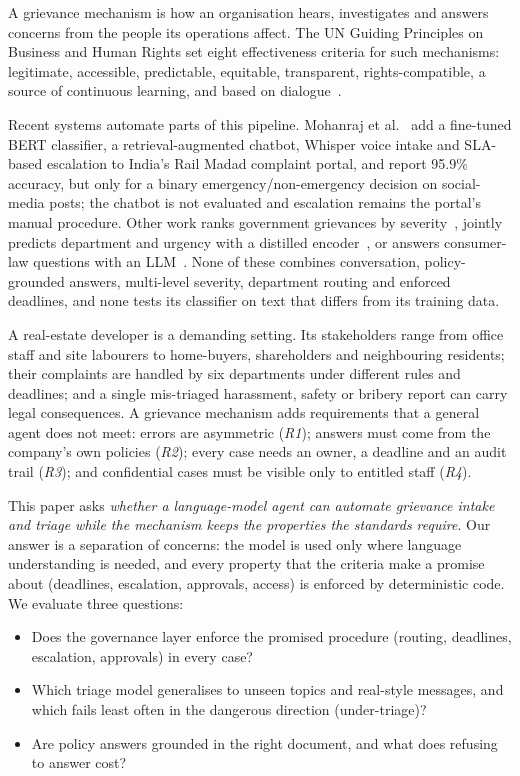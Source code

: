 \documentclass[conference]{IEEEtran}
\begin{document}
A grievance mechanism is how an organisation hears, investigates and answers concerns from the people its
operations affect. The UN Guiding Principles on Business and Human Rights set eight effectiveness criteria for
such mechanisms: legitimate, accessible, predictable, equitable, transparent, rights-compatible, a source of
continuous learning, and based on dialogue~\cite{ungp2011}.

Recent systems automate parts of this pipeline. Mohanraj et al.~\cite{mohanraj2025railmadad} add a fine-tuned BERT
classifier, a retrieval-augmented chatbot, Whisper voice intake and SLA-based escalation to India's Rail Madad
complaint portal, and report 95.9\% accuracy, but only for a binary emergency/non-emergency decision on social-media
posts; the chatbot is not evaluated and escalation remains the portal's manual procedure. Other work ranks
government grievances by severity~\cite{suganya2025autonomous}, jointly predicts department and urgency with a
distilled encoder~\cite{shastri2025aipca}, or answers consumer-law questions with an LLM~\cite{ganatra2025grahak}.
None of these combines conversation, policy-grounded answers, multi-level severity, department routing and
enforced deadlines, and none tests its classifier on text that differs from its training data.

A real-estate developer is a demanding setting. Its stakeholders range from office staff and site labourers to
home-buyers, shareholders and neighbouring residents; their complaints are handled by six departments under
different rules and deadlines; and a single mis-triaged harassment, safety or bribery report can carry legal
consequences. A grievance mechanism adds requirements that a general agent
does not meet: errors are asymmetric (\emph{R1}); answers must come from the company's own policies (\emph{R2});
every case needs an owner, a deadline and an audit trail (\emph{R3}); and confidential cases must be visible only to
entitled staff (\emph{R4}).

This paper asks \emph{whether a language-model agent can automate grievance intake and triage while the mechanism
keeps the properties the standards require}. Our answer is a separation of concerns: the model is used only where
language understanding is needed, and every property that the criteria make a promise about (deadlines,
escalation, approvals, access) is enforced by deterministic code. We evaluate three questions:
\begin{itemize}
\item[\textbf{RQ1}] Does the governance layer enforce the promised procedure (routing, deadlines, escalation,
      approvals) in every case?
\item[\textbf{RQ2}] Which triage model generalises to unseen topics and real-style messages, and which fails least
      often in the dangerous direction (under-triage)?
\item[\textbf{RQ3}] Are policy answers grounded in the right document, and what does refusing to answer cost?
\end{itemize}
\end{document}
